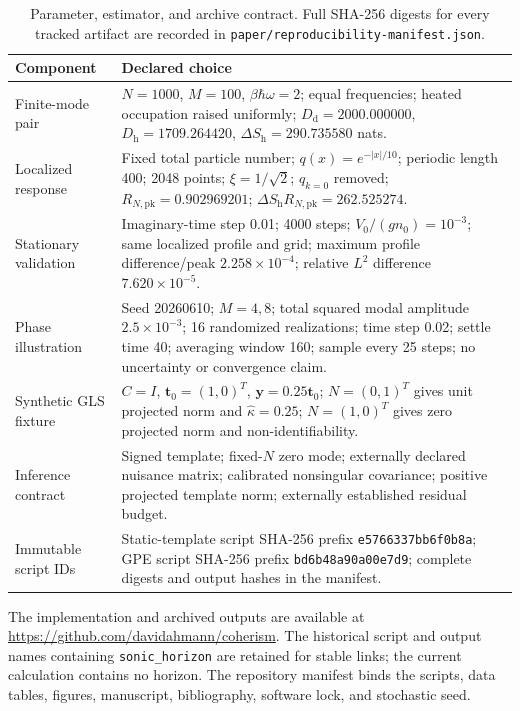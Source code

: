 \documentclass[aps,prd,twocolumn,superscriptaddress,nofootinbib,floatfix]{revtex4-2}
\newcommand{\Drel}{D}
\begin{document}
\begin{table}[t]
\caption{Parameter, estimator, and archive contract. Full SHA-256 digests for every tracked artifact are recorded in \texttt{paper/reproducibility-manifest.json}.}
\label{tab:parameters}
\begin{ruledtabular}
\begin{tabular}{p{}p{}}
Component & Declared choice \\
\hline
Finite-mode pair & $N=1000$, $M=100$, $\beta\hbar\omega=2$; equal frequencies; heated occupation raised uniformly; $\Drel_{\mathrm d}=2000.000000$, $\Drel_{\mathrm h}=1709.264420$, $\Delta S_{\mathrm h}=290.735580$ nats. \\
Localized response & Fixed total particle number; $q(x)=e^{-|x|/10}$; periodic length 400; 2048 points; $\xi=1/\sqrt2$; $q_{k=0}$ removed; $R_{N,\mathrm{pk}}=0.902969201$; $\Delta S_{\mathrm h}R_{N,\mathrm{pk}}=262.525274$. \\
Stationary validation & Imaginary-time step 0.01; 4000 steps; $V_0/(gn_0)=10^{-3}$; same localized profile and grid; maximum profile difference/peak $2.258\times10^{-4}$; relative $L^2$ difference $7.620\times10^{-5}$. \\
Phase illustration & Seed 20260610; $M=4,8$; total squared modal amplitude $2.5\times10^{-3}$; 16 randomized realizations; time step 0.02; settle time 40; averaging window 160; sample every 25 steps; no uncertainty or convergence claim. \\
Synthetic GLS fixture & $C=I$, $\bm t_0=(1,0)^T$, $\bm y=0.25\bm t_0$; $N=(0,1)^T$ gives unit projected norm and $\widehat\kappa=0.25$; $N=(1,0)^T$ gives zero projected norm and non-identifiability. \\
Inference contract & Signed template; fixed-$N$ zero mode; externally declared nuisance matrix; calibrated nonsingular covariance; positive projected template norm; externally established residual budget. \\
Immutable script IDs & Static-template script SHA-256 prefix \texttt{e5766337bb6f0b8a}; GPE script SHA-256 prefix \texttt{bd6b48a90a00e7d9}; complete digests and output hashes in the manifest. \\
\end{tabular}
\end{ruledtabular}
\end{table}

The implementation and archived outputs are available at \url{https://github.com/davidahmann/coherism}. The historical script and output names containing \texttt{sonic\_horizon} are retained for stable links; the current calculation contains no horizon. The repository manifest binds the scripts, data tables, figures, manuscript, bibliography, software lock, and stochastic seed.
\end{document}
